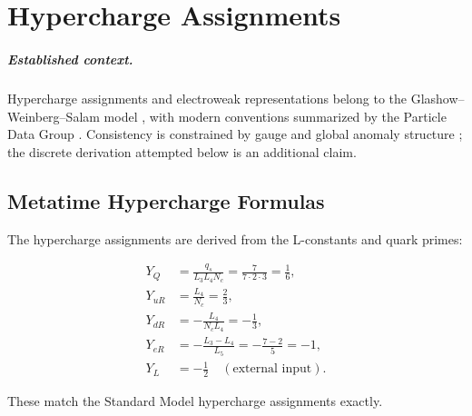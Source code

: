 \chapter{Hypercharge Assignments}
\label{ch:hypercharge}


\paragraph{Established context.}
Hypercharge assignments and electroweak representations belong to the
Glashow--Weinberg--Salam model \cite{Glashow1961,Weinberg1967,Salam1968}, with
modern conventions summarized by the Particle Data Group \cite{PDG2024}.
Consistency is constrained by gauge and global anomaly structure
\cite{Adler1969,BellJackiw1969,witten1982}; the discrete derivation attempted
below is an additional claim.

\section{Metatime Hypercharge Formulas}

The hypercharge assignments are derived from the L-constants and quark
primes:

\[
\begin{aligned}
Y_Q   &= \frac{q_s}{L_3 L_4 N_c}
        = \frac{7}{7 \cdot 2 \cdot 3}
        = \frac{1}{6}, \\[4pt]
Y_{uR} &= \frac{L_4}{N_c}
        = \frac{2}{3}, \\[4pt]
Y_{dR} &= -\frac{L_4}{N_c L_4}
        = -\frac{1}{3}, \\[4pt]
Y_{eR} &= -\frac{L_3 - L_4}{L_5}
        = -\frac{7 - 2}{5}
        = -1, \\[4pt]
Y_L    &= -\frac{1}{2} \quad (\text{external input}).
\end{aligned}
\]

These match the Standard Model hypercharge assignments exactly.
